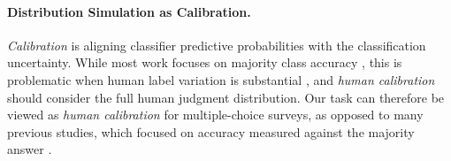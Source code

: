 \paragraph{Distribution Simulation as Calibration.}
\textit{Calibration} is aligning classifier predictive probabilities with the classification uncertainty. While most work focuses on majority class accuracy \cite{li-etal-2024-multiple,he2024investigating}, this is problematic when human label variation is substantial \cite{baan-etal-2022-stop,baan-etal-2024-interpreting}, and \textit{human calibration} should consider the full human judgment distribution.
Our task can therefore be viewed as \textit{human calibration} for multiple-choice surveys, as opposed to many previous studies, which focused on accuracy measured against the majority answer \cite{arora-etal-2023-probing, cao-etal-2023-assessing, alkhamissi-etal-2024-investigating}.

